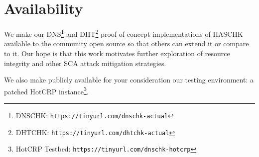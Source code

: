 \section{Availability} \label{sec:availability}

We make our DNS\footnote{DNSCHK: \texttt{https://tinyurl.com/dnschk-actual}} and
DHT\footnote{DHTCHK: \texttt{https://tinyurl.com/dhtchk-actual}}
proof-of-concept implementations of HASCHK available to the community open
source so that others can extend it or compare to it. Our hope is that this work
motivates further exploration of resource integrity and other SCA attack
mitigation strategies.

We also make publicly available for your consideration our testing environment:
a patched HotCRP instance\footnote{HotCRP Testbed:
\texttt{https://tinyurl.com/dnschk-hotcrp}}.
